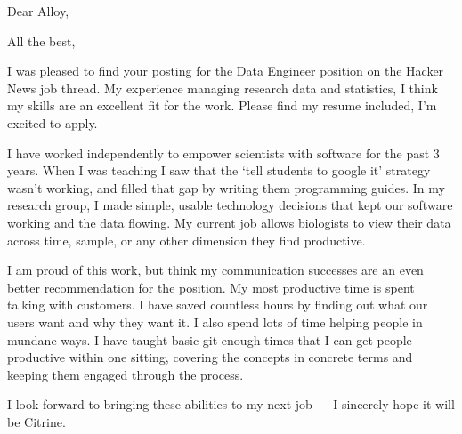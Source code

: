 \documentclass[11pt,a4paper,sans]{moderncv}        %
\begin{document}
\recipient{~}{~}
\date{\today}
\opening{Dear Alloy,}
\closing{All the best,}
\makelettertitle%

I was pleased to find your posting for the Data Engineer position on the Hacker News job thread.
My experience managing research data and statistics, I think my skills are an excellent fit for the work.
Please find my resume included, I'm excited to apply.

I have worked independently to empower scientists with software for the past 3 years.
When I was teaching I saw that the `tell students to google it' strategy wasn't working, and filled that gap by writing them programming guides.
In my research group, I made simple, usable technology decisions that kept our software working and the data flowing.
My current job allows biologists to view their data across time, sample, or any other dimension they find productive.

I am proud of this work, but think my communication successes are an even better recommendation for the position.
My most productive time is spent talking with customers.
I have saved countless hours by finding out what our users want and why they want it.
I also spend lots of time helping people in mundane ways.
I have taught basic git enough times that I can get people productive within one sitting, covering the concepts in concrete terms and keeping them engaged through the process.

I look forward to bringing these abilities to my next job --- I sincerely hope it will be Citrine.

\makeletterclosing%
\end{document}
